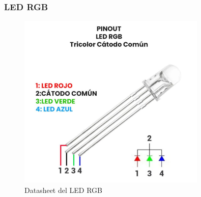 \documentclass[a4paper,12pt]{article}
\begin{document}
	\subsubsection{LED RGB}
	\begin{figure}[H]
		\centering
		\includegraphics[width=0.8\textwidth]{rgb.png}
		\caption{Datasheet del LED RGB}
		\label{fig:rgb_datasheet}
	\end{figure}
\end{document}
